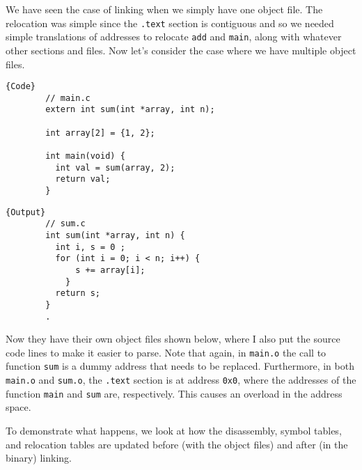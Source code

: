       We have seen the case of linking when we simply have one object file. The relocation was simple since the \texttt{.text} section is contiguous and so we needed simple translations of addresses to relocate \texttt{add} and \texttt{main}, along with whatever other sections and files. Now let's consider the case where we have multiple object files.

      \noindent\begin{minipage}{.50\textwidth}
      \begin{lstlisting}[]{Code}
        // main.c
        extern int sum(int *array, int n); 

        int array[2] = {1, 2};

        int main(void) {
          int val = sum(array, 2); 
          return val; 
        }
      \end{lstlisting}
      \end{minipage}
      \hfill
      \begin{minipage}{.49\textwidth}
      \begin{lstlisting}[]{Output}
        // sum.c
        int sum(int *array, int n) {
          int i, s = 0 ; 
          for (int i = 0; i < n; i++) {
              s += array[i];
            }
          return s;
        }
        .
      \end{lstlisting}
      \end{minipage}

      Now they have their own object files shown below, where I also put the source code lines to make it easier to parse. Note that again, in \texttt{main.o} the call to function \texttt{sum} is a dummy address that needs to be replaced. Furthermore, in both \texttt{main.o} and \texttt{sum.o}, the \texttt{.text} section is at address \texttt{0x0}, where the addresses of the function \texttt{main} and \texttt{sum} are, respectively. This causes an overload in the address space. 

      To demonstrate what happens, we look at how the disassembly, symbol tables, and relocation tables are updated before (with the object files) and after (in the binary) linking.  

